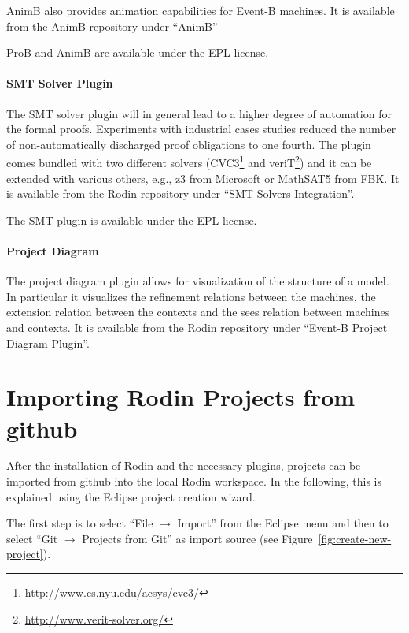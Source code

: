 \documentclass[10pt,a4paper]{article}
\begin{document}
AnimB also provides animation capabilities for Event-B machines. It is available
from the AnimB repository under ``AnimB''

ProB and AnimB are available under the EPL license.

\paragraph{SMT Solver Plugin}
\label{sec:smt-solver-plugin}

The SMT solver plugin will in general lead to a higher degree of automation for
the formal proofs. Experiments with industrial cases studies reduced the number
of non-automatically discharged proof obligations to one fourth. The plugin
comes bundled with two different solvers
(CVC3\footnote{\url{http://www.cs.nyu.edu/acsys/cvc3/}} and
veriT\footnote{\url{http://www.verit-solver.org/}}) and it can be extended with
various others, e.g., z3 from Microsoft or MathSAT5 from FBK. It is available
from the Rodin repository under ``SMT Solvers Integration''.

The SMT plugin is available under the EPL license.

\paragraph{Project Diagram}
\label{sec:project-diagram}

The project diagram plugin allows for visualization of the structure of a
model. In particular it visualizes the refinement relations between the
machines, the extension relation between the contexts and the sees relation
between machines and contexts. It is available from the Rodin repository under
``Event-B Project Diagram Plugin''.

\section{Importing Rodin Projects from github}
\label{sec:import-rodin-proj}

After the installation of Rodin and the necessary plugins, projects can be
imported from github into the local Rodin workspace. In the following, this is
explained using the Eclipse project creation wizard.

The first step is to select ``File $\rightarrow$ Import'' from the Eclipse menu
and then to select ``Git $\rightarrow$ Projects from Git'' as import source (see
Figure~\ref{fig:create-new-project}).
\end{document}
